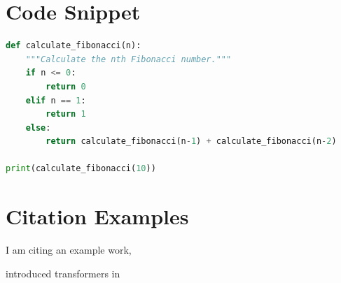 \documentclass{article}
\begin{document}
\section{Code Snippet}
\begin{lstlisting}[language=Python, caption=A simple Python function]
def calculate_fibonacci(n):
    """Calculate the nth Fibonacci number."""
    if n <= 0:
        return 0
    elif n == 1:
        return 1
    else:
        return calculate_fibonacci(n-1) + calculate_fibonacci(n-2)

print(calculate_fibonacci(10))
\end{lstlisting}

\section{Citation Examples}

I am citing an example work, \cite{vaswani2017attention, 10.1093/bioinformatics/btu462}


\citet{vaswani2017attention} introduced transformers in \citeyear{vaswani2017attention}



\end{document}
